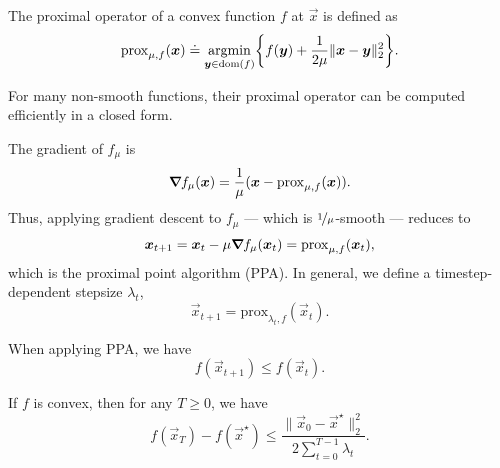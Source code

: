 \begin{definition}
    The proximal operator of a convex function $f$ at $\vec{x}$ is defined as \[
        \mathrm{prox}_{\mu,f}(\vec{x}) \doteq \argmin_{\vec{y} \in \dom{f}} \lft\{ f(\vec{y}) + \frac{1}{2 \mu} \| \vec{x} - \vec{y} \|_2^2 \rgt\}.
    \]
\end{definition}
For many non-smooth functions, their proximal operator can be computed efficiently in a closed form.

The gradient of $f_{\mu}$ is \[
    \bm{\nabla}_{\! } f_{\mu}(\bm{x}) = \frac{1}{\mu} (\bm{x} - \mathrm{prox}_{\mu, f}(\bm{x})).
\]
Thus, applying gradient descent to $f_{\mu}$ --- which is $\nicefrac{1}{\mu}$-smooth --- reduces to \[
    \bm{x}_{t+1} = \bm{x}_t - \mu \bm{\nabla}_{\! } f_{\mu}(\bm{x}_t) = \mathrm{prox}_{\mu, f}(\bm{x}_t),
\]
which is the proximal point algorithm (PPA). In general, we define a timestep-dependent stepsize
$\lambda_t$, \[
    \vec{x}_{t+1} = \mathrm{prox}_{\lambda_t, f}(\vec{x}_t).
\]

\begin{corollary}
    \label{cor:ppa-descent}

    When applying PPA, we have \[
        f(\vec{x}_{t+1}) \leq f(\vec{x}_t).
    \]
\end{corollary}

\begin{theorem}
    If $f$ is convex, then for any $T \geq 0$, we have \[
        f(\vec{x}_T) - f(\vec{x}^\star) \leq \frac{\| \vec{x}_0 - \vec{x}^\star \|_2^2}{2 \sum_{t=0}^{T-1} \lambda_t}.
    \]
\end{theorem}


